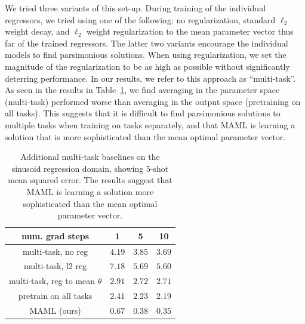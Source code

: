 \documentclass{article}
\begin{document}
We tried three variants of this set-up. During training of the individual regressors, we tried using one of the following: no regularization, standard $\ell_2$ weight decay, and $\ell_2$ weight regularization to the mean parameter vector thus far of the trained regressors. The latter two variants encourage the individual models to find parsimonious solutions. When using regularization, we set the magnitude of the regularization to be as high as possible without significantly deterring performance. In our results, we refer to this approach as ``multi-task''. As seen in the results in Table~\ref{tbl:multitask_baselines}, we find averaging in the parameter space (multi-task) performed worse than averaging in the output space (pretraining on all tasks). This suggests that it is difficult to find parsimonious solutions to multiple tasks when training on tasks separately, and that MAML is learning a solution that is more sophisticated than the mean optimal parameter vector.


\begin{table}[t]
\caption{Additional multi-task baselines on the sinusoid regression domain, showing 5-shot mean squared error. The results suggest that MAML is learning a solution more sophisticated than the mean optimal parameter vector.}
\label{tbl:multitask_baselines}
\begin{center}
\begin{tabular}{c|c|c|c}
\hline
num. grad steps &  1   & 5 & 10\\
\hline
multi-task, no reg &  $4.19$ & $3.85$ & $3.69$ \\
\hline
multi-task, l2 reg & $7.18$ & $5.69$ & $5.60$ \\
\hline
multi-task, reg to mean $\theta$ & $2.91$ &$ 2.72$ & $2.71$ \\ %
\hline
pretrain on all tasks & $2.41$ & $2.23$ & $2.19$ \\
\hline
MAML (ours) & $\mathbf{0.67}$ & $\mathbf{0.38}$ & $\mathbf{0.35}$ \\
\hline
\end{tabular}
\end{center}
\end{table}
\end{document}
